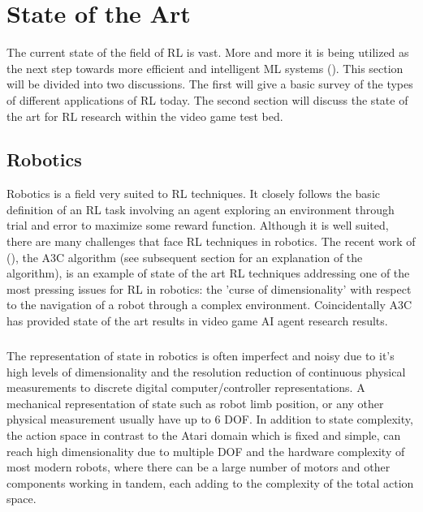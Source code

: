 \chapter{State of the Art}
The current state of the field of RL is vast. More and more it is being utilized as the next step towards more efficient and intelligent ML systems (\citet{survey-drl}). This section will be divided into two discussions. The first will give a basic survey of the types of different applications of RL today. The second section will discuss the state of the art for RL research within the video game test bed.

\section{Robotics}
Robotics is a field very suited to RL techniques. It closely follows the basic definition of an RL task involving an agent exploring an environment through trial and error to maximize some reward function. Although it is well suited, there are many challenges that face RL techniques in robotics. The recent work of (\citet{a3c}), the A3C algorithm (see subsequent section for an explanation of the algorithm), is an example of state of the art RL techniques addressing one of the most pressing issues for RL in robotics: the 'curse of dimensionality' with respect to the navigation of a robot through a complex environment. Coincidentally A3C has provided state of the art results in video game AI agent research results. \paragraph{}

The representation of state in robotics is often imperfect and noisy due to it's high levels of dimensionality and the resolution reduction of continuous physical measurements to discrete digital computer/controller representations. A mechanical representation of state such as robot limb position, or any other physical measurement usually have up to 6 DOF. In addition to state complexity, the action space in contrast to the Atari domain which is fixed and simple, can reach high dimensionality due to multiple DOF and the hardware complexity of most modern robots, where there can be a large number of motors and other components working in tandem, each adding to the complexity of the total action space. \paragraph{}

